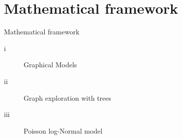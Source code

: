 \documentclass[11pt]{beamer}
\newcommand{\bleu}[1]{\textcolor{Framableulight}{#1}}
\begin{document}
\section{Mathematical framework}

\begin{frame}{}
\begin{center}
\Huge{\bleu{Mathematical framework}}
\end{center}
\normalsize
\begin{center}
\begin{description}
\item[i] {Graphical Models}
\item[ii]  Graph exploration with trees
\item[iii]  Poisson log-Normal model
\end{description}
\end{center}

\end{frame}
\end{document}
